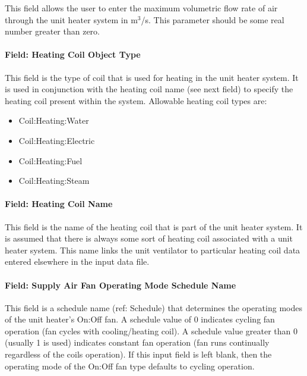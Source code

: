 This field allows the user to enter the maximum volumetric flow rate of air through the unit heater system in m\(^{3}\)/s. This parameter should be some real number greater than zero.

\paragraph{Field: Heating Coil Object Type}\label{field-heating-coil-object-type-2-000}

This field is the type of coil that is used for heating in the unit heater system. It is used in conjunction with the heating coil name (see next field) to specify the heating coil present within the system. Allowable heating coil types are:

\begin{itemize}
\item
  Coil:Heating:Water
\item
  Coil:Heating:Electric
\item
  Coil:Heating:Fuel
\item
  Coil:Heating:Steam
\end{itemize}

\paragraph{Field: Heating Coil Name}\label{field-heating-coil-name-2-000}

This field is the name of the heating coil that is part of the unit heater system. It is assumed that there is always some sort of heating coil associated with a unit heater system. This name links the unit ventilator to particular heating coil data entered elsewhere in the input data file.

\paragraph{Field: Supply Air Fan Operating Mode Schedule Name}\label{field-supply-air-fan-operating-mode-schedule-name-2-000}

This field is a schedule name (ref: Schedule) that determines the operating modes of the unit heater's On:Off fan. A schedule value of 0 indicates cycling fan operation (fan cycles with cooling/heating coil). A schedule value greater than 0 (usually 1 is used) indicates constant fan operation (fan runs continually regardless of the coils operation). If this input field is left blank, then the operating mode of the On:Off fan type defaults to cycling operation.

